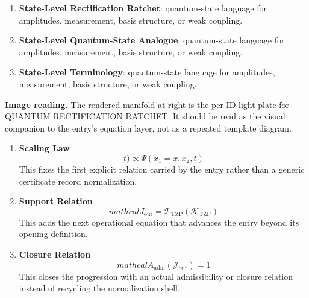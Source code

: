 \begin{enumerate}[leftmargin=1.6em,itemsep=6pt,topsep=4pt]
\item \textbf{State-Level Rectification Ratchet}: quantum-state language for amplitudes, measurement, basis structure, or weak coupling.
\item \textbf{State-Level Quantum-State Analogue}: quantum-state language for amplitudes, measurement, basis structure, or weak coupling.
\item \textbf{State-Level Terminology}: quantum-state language for amplitudes, measurement, basis structure, or weak coupling.
\end{enumerate}

\begin{samepage}
\noindent\begin{minipage}[t]{0.45\linewidth}
\vspace{0pt}
\raggedright
\scriptsize\textbf{Image reading.} The rendered manifold at right is the per-ID light plate for QUANTUM RECTIFICATION RATCHET. It should be read as the visual companion to the entry's equation layer, not as a repeated template diagram.\par
\end{minipage}\hfill
\begin{minipage}[t]{0.53\linewidth}
\vspace*{-0.10in}
\raggedright
{}
\end{minipage}
\end{samepage}

\clearpage


\begin{enumerate}[leftmargin=1.6em,itemsep=9pt,topsep=6pt]
\item \textbf{Scaling Law}
\[
t) \propto \Psi(x_1=x,x_2,t)
\]
This fixes the first explicit relation carried by the entry rather than a generic certificate record normalization.

\item \textbf{Support Relation}
\[
mathcal{J}_{\mathrm{out}} = \mathcal{T}_{\mathrm{TZP}}\!\left(\mathcal{K}_{\mathrm{TZP}}\right)
\]
This adds the next operational equation that advances the entry beyond its opening definition.

\item \textbf{Closure Relation}
\[
mathcal{A}_{\mathrm{adm}}\!\left(\mathcal{J}_{\mathrm{out}}\right)=1
\]
This closes the progression with an actual admissibility or closure relation instead of recycling the normalization shell.
\end{enumerate}

